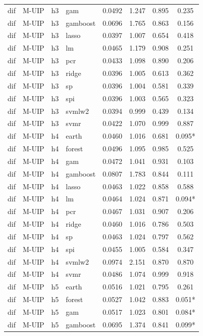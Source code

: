 \begin{ThreePartTable}
\begin{longtable}[t]{llclcccc}
dif & M-UIP & h3 & gam & 0.0492 & 1.247 & 0.895 & 0.235\\
dif & M-UIP & h3 & gamboost & 0.0696 & 1.765 & 0.863 & 0.156\\
dif & M-UIP & h3 & lasso & 0.0397 & 1.007 & 0.654 & 0.418\\
dif & M-UIP & h3 & lm & 0.0465 & 1.179 & 0.908 & 0.251\\
dif & M-UIP & h3 & pcr & 0.0433 & 1.098 & 0.890 & 0.206\\
dif & M-UIP & h3 & ridge & 0.0396 & 1.005 & 0.613 & 0.362\\
dif & M-UIP & h3 & sp & 0.0396 & 1.004 & 0.581 & 0.339\\
dif & M-UIP & h3 & spi & 0.0396 & 1.003 & 0.565 & 0.323\\
dif & M-UIP & h3 & svmlw2 & 0.0394 & 0.999 & 0.439 & 0.134\\
dif & M-UIP & h3 & svmr & 0.0422 & 1.070 & 0.999 & 0.887\\
\addlinespace
dif & M-UIP & h4 & earth & 0.0460 & 1.016 & 0.681 & 0.095*\\
dif & M-UIP & h4 & forest & 0.0496 & 1.095 & 0.985 & 0.525\\
dif & M-UIP & h4 & gam & 0.0472 & 1.041 & 0.931 & 0.103\\
dif & M-UIP & h4 & gamboost & 0.0807 & 1.783 & 0.844 & 0.111\\
dif & M-UIP & h4 & lasso & 0.0463 & 1.022 & 0.858 & 0.588\\
dif & M-UIP & h4 & lm & 0.0464 & 1.024 & 0.871 & 0.094*\\
dif & M-UIP & h4 & pcr & 0.0467 & 1.031 & 0.907 & 0.206\\
dif & M-UIP & h4 & ridge & 0.0460 & 1.016 & 0.786 & 0.503\\
dif & M-UIP & h4 & sp & 0.0463 & 1.024 & 0.797 & 0.562\\
dif & M-UIP & h4 & spi & 0.0455 & 1.005 & 0.584 & 0.347\\
dif & M-UIP & h4 & svmlw2 & 0.0974 & 2.151 & 0.870 & 0.870\\
dif & M-UIP & h4 & svmr & 0.0486 & 1.074 & 0.999 & 0.918\\
\addlinespace
dif & M-UIP & h5 & earth & 0.0516 & 1.021 & 0.795 & 0.261\\
dif & M-UIP & h5 & forest & 0.0527 & 1.042 & 0.883 & 0.051*\\
dif & M-UIP & h5 & gam & 0.0517 & 1.023 & 0.801 & 0.084*\\
dif & M-UIP & h5 & gamboost & 0.0695 & 1.374 & 0.841 & 0.099*\\

\end{longtable}
\end{ThreePartTable}
